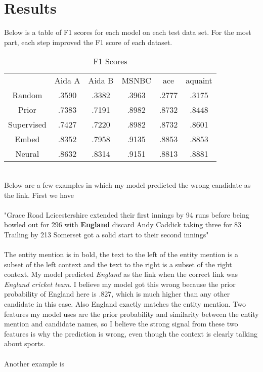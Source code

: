 \documentclass{article}
\begin{document}
\section{Results}
Below is a table of F1 scores for each model on each test data set. For the most part, each step improved the F1 score of each dataset. 
\begin{table}[ht]
\begin{tabular}{ |c|c|c|c|c|c| }
 \hline
  & Aida A & Aida B & MSNBC & ace & aquaint\\
 \cline{0-5}
 Random & .3590 & .3382 & .3963 & .2777 & .3175\\
 \cline{0-5}
 Prior & .7383 & .7191 & .8982 & .8732 & .8448\\
 \cline{0-5}
 Supervised & .7427 & .7220 & .8982 & .8732 & .8601\\
 \cline{0-5}
 Embed & .8352 & .7958 & .9135 & .8853 & .8853\\
 \cline{0-5}
 Neural & .8632 & .8314 & .9151 & .8813 & .8881\\
 \hline
\end{tabular}
\caption{F1 Scores}
\end{table}\\
Below are a few examples in which my model predicted the wrong candidate as the link.  First we have\\\\
"Grace Road Leicestershire extended their first innings by 94 runs before being bowled out for 296 with \textbf{England} discard Andy Caddick taking three for 83 Trailing by 213 Somerset got a solid start to their second innings"\\\\
The entity mention is in bold, the text to the left of the entity mention is a subset of the left context and the text to the right is a subset of the right context. My model predicted \textit{England} as the link when the correct link was \textit{England cricket team}.  I believe my model got this wrong because the prior probability of England here is .827, which is much higher than any other candidate in this case.  Also England exactly matches the entity mention.  Two features my model uses are the prior probability and similarity between the entity mention and candidate names, so I believe the strong signal from these two features is why the prediction is wrong, even though the context is clearly talking about sports.\\\\
Another example is\\\\
\end{document}
